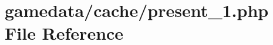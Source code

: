\hypertarget{present__1_8php}{\section{gamedata/cache/present\+\_\+1.php File Reference}
\label{present__1_8php}
}

